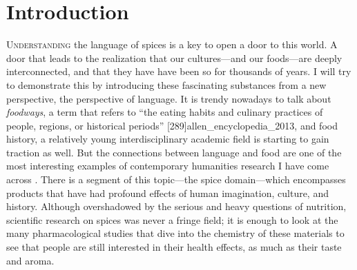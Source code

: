 



\chapter{Introduction}
\label{ch:introduction}





\lettrine[lines=\iniciale]{\textcolor{\accentcolor}{U}}{nderstanding} the language of spices is a key to open a door to this world. A door that leads to the realization that our cultures---and our foods---are deeply interconnected, and that they have have been so for thousands of years. I will try to demonstrate this by introducing these fascinating substances from a new perspective, the perspective of language. It is trendy nowadays to talk about \textit{foodways}, a term that refers to ``the eating habits and culinary practices of people, regions, or historical periods'' [289]{allen_encyclopedia_2013}, and food history, a relatively young interdisciplinary academic field is starting to gain traction as well. But the connections between language and food are one of the most interesting examples of contemporary humanities research I have come across \textcite[see][]{jurafsky_language_2014}. There is a segment of this topic---the spice domain---which encompasses products that have had profound effects of human imagination, culture, and history. Although overshadowed by the serious and heavy questions of nutrition, scientific research on spices was never a fringe field; it is enough to look at the many pharmacological studies that dive into the chemistry of these materials to see that people are still interested in their health effects, as much as their taste and aroma.

